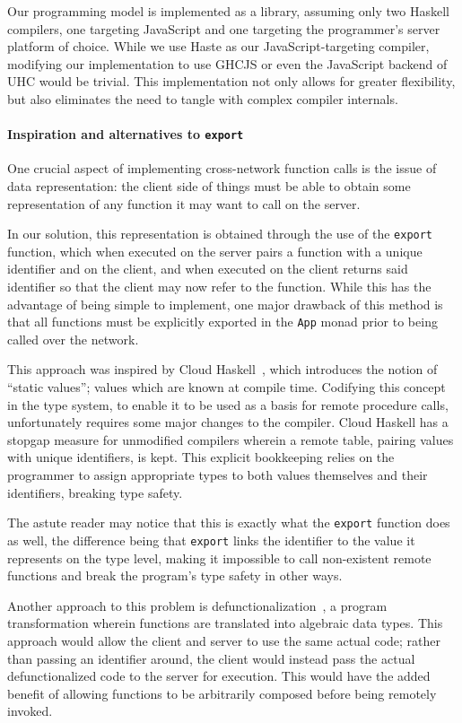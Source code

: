 \documentclass[preprint]{sigplanconf}
\begin{document}
Our programming model is implemented as a library, assuming only two Haskell
compilers, one targeting JavaScript and one targeting the programmer's server
platform of choice. While we use Haste as our JavaScript-targeting compiler,
modifying our implementation to use GHCJS or even the JavaScript backend of UHC
would be trivial. This implementation not only allows for greater flexibility,
but also eliminates the need to tangle with complex compiler internals.

\paragraph{Inspiration and alternatives to \lstinline!export!}
\label{sec:cloudhaskell}
One crucial aspect of implementing cross-network function calls is the issue of
data representation: the client side of things must be able to obtain some
representation of any function it may want to call on the server.

In our solution, this representation is obtained through the use of the \lstinline!export! function, which when executed on the server pairs a function with a
unique identifier and on the client, and when executed on the client returns
said identifier so that the client may now refer to the function. While this
has the advantage of being simple to implement, one major drawback of this
method is that all functions must be explicitly exported in the \lstinline!App!
monad prior to being called over the network.

This approach was inspired by Cloud Haskell\ \cite{cloudhaskell}, which
introduces the notion of ``static values''; values which are known at compile
time. Codifying this concept in the type system, to enable it to be used as a
basis for remote procedure calls, unfortunately requires some major changes to
the compiler. Cloud Haskell has a stopgap measure for unmodified compilers
wherein a remote table, pairing values with unique identifiers, is kept.
This explicit bookkeeping relies on the programmer to assign appropriate types
to both values themselves and their identifiers, breaking type safety.

The astute reader may notice that this is exactly what the \lstinline!export!
function does as well, the difference being that \lstinline!export! links the
identifier to the value it represents on the type level, making it impossible
to call non-existent remote functions and break the program's type safety in
other ways.

Another approach to this problem is
defunctionalization\ \cite{defunctionalization}, a program transformation
wherein functions are translated into algebraic data types. This approach would
allow the client and server to use the same actual code; rather than passing
an identifier around, the client would instead pass the actual defunctionalized
code to the server for execution. This would have the added benefit of allowing
functions to be arbitrarily composed before being remotely invoked.
\end{document}
